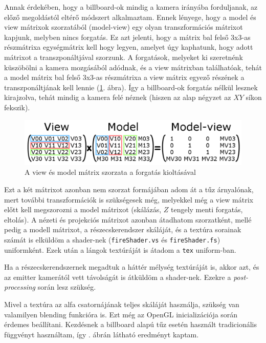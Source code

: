 Annak érdekében, hogy a billboard-ok mindig a kamera irányába forduljanak, az előző megoldástól eltérő módszert alkalmaztam. Ennek lényege, hogy a model és view mátrixok szorzatából (model-view) egy olyan transzformációs mátrixot kapjunk, melyben nincs forgatás. Ez azt jelenti, hogy a mátrix bal felső 3x3-as részmátrixa egységmátrix kell hogy legyen, amelyet úgy kaphatunk, hogy adott mátrixot a transzponáltjával szorzunk. A forgatások, melyeket ki szeretnénk küszöbölni a kamera mozgásából adódnak, és a view mátrixban találhatóak, tehát a model mátrix bal felső 3x3-as részmátrixa a view mátrix egyező részének a transzponáltjának kell lennie (\ref{fig:matrixRotation}. ábra). Így a billboard-ok forgatás nélkül lesznek kirajzolva, tehát mindig a kamera felé néznek (hiszen az alap négyzet az $XY$ síkon fekszik).
\begin{figure}[h]
 \centering
 \includegraphics[width=\textwidth]{kepek/matrixRotation.png}
 \caption{A view és model mátrix szorzata a forgatás kioltásával}
 \label{fig:matrixRotation}
\end{figure}
Ezt a két mátrixot azonban nem szorzat formájában adom át a tűz árnyalónak, mert további transzformációk is szükségesek még, melyekkel még a view mátrix előtt kell megszorozni a model mátrixot (skálázás, $Z$ tengely menti forgatás, eltolás). A nézeti és projekciós mátrixot azonban átadhatom szorzatként, mellé pedig a modell mátrixot, a részecskerendszer skáláját, és a textúra sorainak számát is elküldöm a shader-nek (\texttt{fireShader.vs} és \texttt{fireShader.fs}) uniformként. Ezek után a lángok textúráját is átadom a \texttt{tex} uniform-ban. 

Ha a részecskerendszernek megadtuk a háttér mélység textúráját is, akkor azt, és az emitter kamerától vett távolságát is átküldöm a shader-nek. Ezekre a \textit{post-processing} során lesz szükség.

Mivel a textúra az alfa csatornájának teljes skáláját használja, szükség van valamilyen blending funkcióra is. Ezt még az OpenGL inicializációja során érdemes beállítani. Kezdésnek a billboard alapú tűz esetén használt tradicionális függvényt használtam, így . ábrán látható eredményt kaptam.

